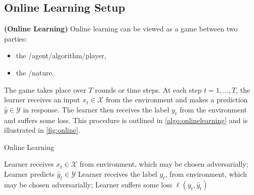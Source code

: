 \documentclass{article}
\newcommand{\bfs}[1]{\textbf{({#1}) }}
\begin{document}
\subsection{Online Learning Setup}
\begin{defa}\bfs{Online Learning}
Online learning can be viewed as a game between two parties: 
\begin{itemize}
    \item the /agent/algorithm/player, 
    \item the /nature.
\end{itemize}
The game takes place over $T$ rounds or time steps. At each step $t=1, \ldots, T$, the learner receives an input $x_{t} \in \mathcal{X}$ from the environment and makes a prediction $\hat{y} \in \mathcal{Y}$ in response. The learner then receives the label $y_{t}$ from the environment and suffers some loss. This procedure is outlined in \cref{algo:onlinelearning} and is illustrated in \cref{fig:online}.
\begin{algorithm}[H]
    \caption{Online Learning}\label{algo:onlinelearning}
    \begin{algorithmic}[1]
                \STATE Learner receives $x_{t} \in \mathcal{X}$ from environment, which may be chosen adversarially;
                \STATE  Learner predicts $\hat{y}_t \in \mathcal{Y}$ 
                \STATE Learner receives the label $y_{t}$, from environment, which may be chosen adversarially; 
                \STATE Learner suffers some loss $\ell\left(y_{t}, \hat{y}_{t}\right)$
        \ENDFOR
    \end{algorithmic}
\end{algorithm}
\begin{figure}
\centering



\begin{tikzpicture}[x=0.75pt,y=0.75pt,yscale=-1,xscale=1]


\end{tikzpicture}
\end{figure}
\end{defa}
\end{document}
